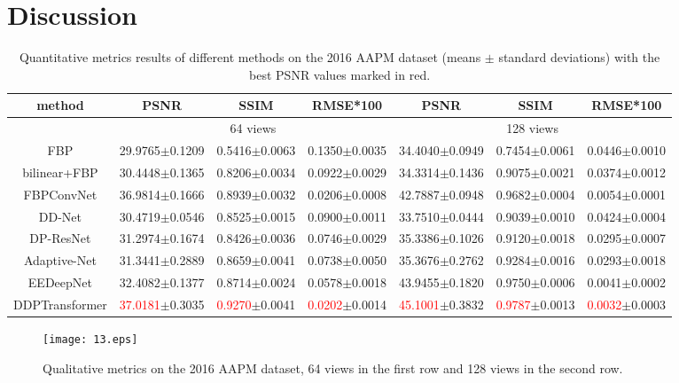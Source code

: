 \documentclass[lettersize,journal]{IEEEtran}
\begin{document}
\section{Discussion}
\begin{table}[!t]
	\caption{Quantitative metrics results of different methods on the 2016 AAPM dataset (means $\pm$ standard deviations) with the best PSNR values marked in red.}
	\label{tab4}
	\centering
		\begin{tabular}{cccc|ccc}
			\hline
			method & PSNR & SSIM & RMSE*100 & PSNR & SSIM &RMSE*100 \\ 
			\hline
			& \multicolumn{3}{c|}{64 views} & \multicolumn{3}{c}{128 views} \\ 
			\hline
			FBP & 29.9765$\pm$0.1209
			& 0.5416$\pm$0.0063
			& 0.1350$\pm$0.0035
			& 34.4040$\pm$0.0949
			& 0.7454$\pm$0.0061
			& 0.0446$\pm$0.0010 \\
			bilinear+FBP 
			& 30.4448$\pm$0.1365
			& 0.8206$\pm$0.0034
			& 0.0922$\pm$0.0029
			& 34.3314$\pm$0.1436
			& 0.9075$\pm$0.0021 
			& 0.0374$\pm$0.0012 \\
			FBPConvNet
			& 36.9814$\pm$0.1666
			& 0.8939$\pm$0.0032 
			& 0.0206$\pm$0.0008
			& 42.7887$\pm$0.0948
			& 0.9682$\pm$0.0004
			& 0.0054$\pm$0.0001 \\
			DD-Net 
			& 30.4719$\pm$0.0546
			& 0.8525$\pm$0.0015
			& 0.0900$\pm$0.0011
			& 33.7510$\pm$0.0444
			& 0.9039$\pm$0.0010
			& 0.0424$\pm$0.0004 \\			
			DP-ResNet 
			& 31.2974$\pm$0.1674
			& 0.8426$\pm$0.0036
			& 0.0746$\pm$0.0029
			& 35.3386$\pm$0.1026
			& 0.9120$\pm$0.0018
			& 0.0295$\pm$0.0007 \\
			Adaptive-Net 
			& 31.3441$\pm$0.2889
			& 0.8659$\pm$0.0041
			& 0.0738$\pm$0.0050
			& 35.3676$\pm$0.2762
			& 0.9284$\pm$0.0016
			& 0.0293$\pm$0.0018 \\
			EEDeepNet 
			& 32.4082$\pm$0.1377 
			& 0.8714$\pm$0.0024
			& 0.0578$\pm$0.0018
			& 43.9455$\pm$0.1820
			& 0.9750$\pm$0.0006
			& 0.0041$\pm$0.0002 \\
			DDPTransformer 
			& \textcolor{red}{37.0181}$\pm$0.3035
			& \textcolor{red}{0.9270}$\pm$0.0041
			& \textcolor{red}{0.0202}$\pm$0.0014
			& \textcolor{red}{45.1001}$\pm$0.3832
			& \textcolor{red}{0.9787}$\pm$0.0013
			& \textcolor{red}{0.0032}$\pm$0.0003 \\ 
			\hline
	\end{tabular}
\end{table}
\begin{figure}[!t]
	\centering
	\texttt{[image: 13.eps]}
	\caption{Qualitative metrics on the 2016 AAPM dataset, 64 views in the first row and 128 views in the second row.}
	\label{fig13}
\end{figure}
\end{document}
